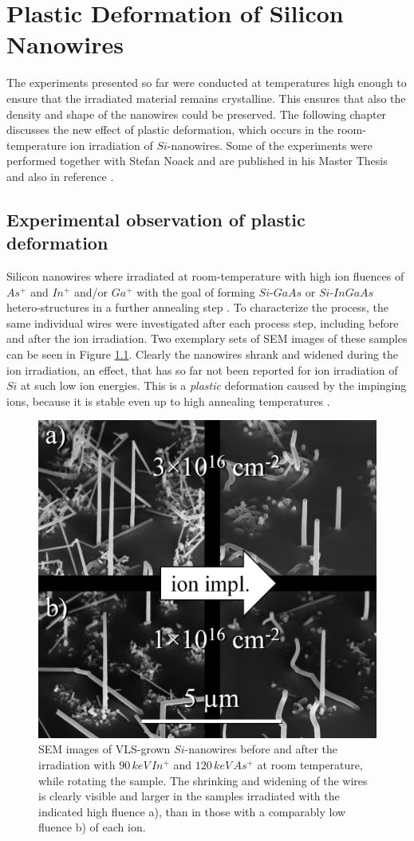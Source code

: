 \chapter{Plastic Deformation of Silicon Nanowires}
\label{sec:plastic}

The experiments presented so far were conducted at temperatures high enough to ensure that the irradiated material remains crystalline. This ensures that also the density and shape of the nanowires could be preserved. The following chapter discusses the new effect of plastic deformation, which occurs in the room-temperature ion irradiation of $Si$-nanowires. Some of the experiments were performed together with Stefan Noack and are published in his Master Thesis \cite{noack_sputter_2014} and also in reference \cite{johannes_anomalous_2015}.

\section{Experimental observation of plastic deformation}
\label{sec:expdeformation}

Silicon nanowires where irradiated at room-temperature with high ion fluences of $As^+$ and $In^+$ and/or $Ga^+$ with the goal of forming $Si$-$GaAs$ or $Si$-$InGaAs$ hetero-structures in a further annealing step \cite{prucnal_iii-v_2014,glaser_personal_2015}. To characterize the process, the same individual wires were investigated after each process step, including before and after the ion irradiation. Two exemplary sets of SEM images of these samples can be seen in Figure \ref{deformSEM}. Clearly the nanowires shrank and widened during the ion irradiation, an effect, that has so far not been reported for ion irradiation of $Si$ at such low ion energies. This is a \emph{plastic} deformation caused by the impinging ions, because it is stable even up to high annealing temperatures \cite{prucnal_iii-v_2014,glaser_personal_2015}.

\begin{figure}
	\centering
		\includegraphics[width=.45\textwidth]{images/deformSEM.png}
	\caption{SEM images of VLS-grown $Si$-nanowires before and after the irradiation with $90\,keV\, In^+$ and $120\,keV\,As^+$ at room temperature, while rotating the sample. The shrinking and widening of the wires is clearly visible and larger in the samples irradiated with the indicated high fluence a), than in those with a comparably low fluence b) of each ion.} 
	\label{deformSEM}
\end{figure}

